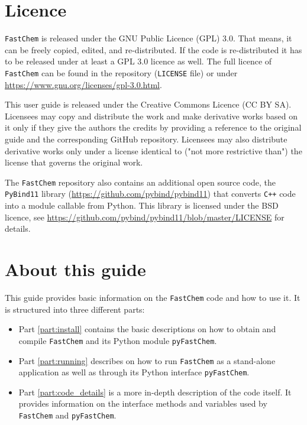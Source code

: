 \documentclass[numbers=noenddot]{fcmanual}
\newcommand{\fc}{\texttt{FastChem}\xspace}
\newcommand{\pfc}{\texttt{pyFastChem}\xspace}
\newcommand{\cpp}{\ttt{C++}\xspace}
\newcommand{\pb}{\texttt{PyBind11}\xspace}
\newcommand{\ttt}[1]{\texttt {#1}}
\begin{document}
\section{Licence}

\fc is released under the GNU Public Licence (GPL) 3.0. That means, it can be freely copied, edited, and re-distributed. If the code is re-distributed it has to be released under at least a GPL 3.0 licence as well. The full licence of \fc can be found in the repository (\ttt{LICENSE} file) or under \url{https://www.gnu.org/licenses/gpl-3.0.html}.

This user guide is released under the Creative Commons Licence (CC BY SA). Licensees may copy and distribute the work and make derivative works based on it only if they give the authors the credits by providing a reference to the original guide and the corresponding GitHub repository. Licensees may also distribute derivative works only under a license identical to ("not more restrictive than") the license that governs the original work.

The \fc repository also contains an additional open source code, the \pb library (\url{https://github.com/pybind/pybind11}) that converts \cpp code into a module callable from Python.
This library is licensed under the BSD licence, see \url{https://github.com/pybind/pybind11/blob/master/LICENSE} for details.

\newpage

\section{About this guide}

This guide provides basic information on the \fc code and how to use it. It is structured into three different parts:

\begin{itemize}
  \item Part \ref{part:install} contains the basic descriptions on how to obtain and compile \fc and its Python module \pfc.

  \item Part \ref{part:running} describes on how to run \fc as a stand-alone application as well as through its Python interface \pfc.

  \item Part \ref{part:code_details} is a more in-depth description of the code itself. It provides information on the interface methods and variables used by \fc and \pfc.
\end{itemize}
\end{document}
